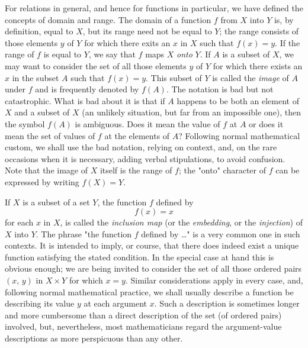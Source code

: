 For relations in general, and hence for functions in particular, we have defined the concepts of domain and range. The domain of a function $f$ from $X$ into $Y$ is, by definition, equal to $X$, but its range need not be equal to $Y$; the range consists of those elements $y$ of $Y$ for which there exits an $x$ in $X$ such that $f(x) = y$. If the range of $f$ is equal to $Y$, we say that $f$ maps $X$ \textit{onto} $Y$. If $A$ is a subset of $X$, we may want to consider the set of all those elements $y$ of $Y$ for which there exists an $x$ in the subset $A$ such that $f(x) = y$. This subset of $Y$ is called the \textit{image} of $A$ under $f$ and is frequently denoted by $f(A)$. The notation is bad but not catastrophic. What is bad about it is that if $A$ happens to be both an element of $X$ and a subset of $X$ (an unlikely situation, but far from an impossible one), then the symbol $f(A)$ is ambiguous. Does it mean the value of $f$ at $A$ or does it mean the set of values of $f$ at the elements of $A$? Following normal mathematical custom, we shall use the bad notation, relying on context, and, on the rare occasions when it is necessary, adding verbal stipulations, to avoid confusion. Note that the image of $X$ itself is the range of $f$; the "onto" character of $f$ can be expressed by writing $f(X) = Y$.

If $X$ is a subset of a set $Y$, the function $f$ defined by
\[
	f(x) = x
\]
for each $x$ in $X$, is called the \textit{inclusion map} (or the \textit{embedding}, or the \textit{injection}) of $X$ into $Y$. The phrase "the function $f$ defined by \dots" is a very common one in such contexts. It is intended to imply, or course, that there does indeed exist a unique function satisfying the stated condition. In the special case at hand this is obvious enough; we are being invited to consider the set of all those ordered pairs $(x, \, y)$ in $X \times Y$ for which $x = y$. Similar considerations apply in every case, and, following normal mathematical practice, we shall usually describe a function be describing its value $y$ at each argument $x$. Such a description is sometimes longer and more cumbersome than a direct description of the set (of ordered pairs) involved, but, nevertheless, most mathematicians regard the argument-value descriptions as more perspicuous than any other.

